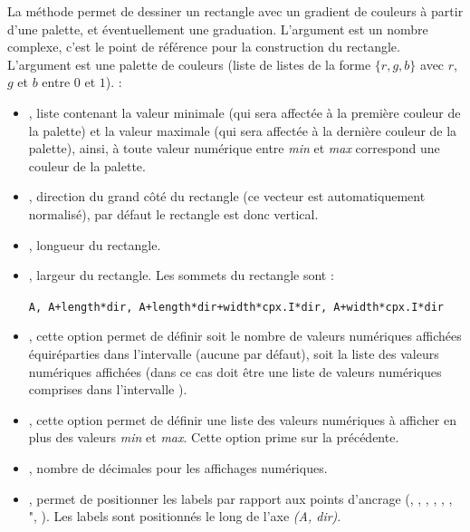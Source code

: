 La méthode  permet de dessiner un rectangle avec un gradient de couleurs à partir d'une palette, et éventuellement une graduation. L'argument  est un nombre complexe, c'est le point de référence pour la construction du rectangle. L'argument  est une palette de couleurs (liste de listes de la forme $\{r,g,b\}$ avec $r$, $g$ et $b$ entre $0$ et $1$).  \writeoptions :
\begin{itemize}
    \item {}, liste contenant la valeur minimale (qui sera affectée à la première couleur de la palette) et la valeur maximale (qui sera affectée à la dernière couleur de la palette), ainsi, à toute valeur numérique entre \emph{min} et \emph{max} correspond une couleur de la palette.
    
    \item {}, direction du grand côté du rectangle (ce vecteur est automatiquement normalisé), par défaut le rectangle est donc vertical.
    
    \item {}, longueur du rectangle.
    
    \item {}, largeur du rectangle. Les sommets du rectangle sont :\par
    \hfil\verb|A, A+length*dir, A+length*dir+width*cpx.I*dir, A+width*cpx.I*dir|\hfil\par
    
    \item {}, cette option permet de définir soit le nombre de valeurs numériques affichées équiréparties dans l'intervalle  (aucune par défaut), soit la liste des valeurs numériques affichées (dans ce cas  doit être une liste de valeurs numériques comprises dans l'intervalle ).
    
    \item {}, cette option permet de définir une liste des valeurs numériques à afficher en plus des valeurs \emph{min} et \emph{max}. Cette option prime sur la précédente.
    
    \item {}, nombre de décimales pour les affichages numériques. 
    
    \item {}, permet de positionner les labels par rapport aux points d'ancrage (, , , , , , ", ). Les labels sont positionnés le long de l'axe \emph{(A, dir)}.
\end{itemize}


